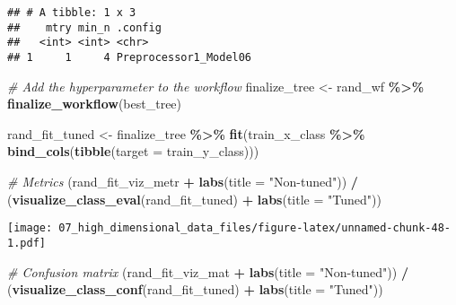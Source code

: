 \documentclass[
]{book}
\newenvironment{Shaded}{\begin{snugshade}}{\end{snugshade}}
\newcommand{\CommentTok}[1]{\textcolor[rgb]{0.56,0.35,0.01}{\textit{#1}}}
\newcommand{\DataTypeTok}[1]{\textcolor[rgb]{0.13,0.29,0.53}{#1}}
\newcommand{\KeywordTok}[1]{\textcolor[rgb]{0.13,0.29,0.53}{\textbf{#1}}}
\newcommand{\NormalTok}[1]{#1}
\newcommand{\OperatorTok}[1]{\textcolor[rgb]{0.81,0.36,0.00}{\textbf{#1}}}
\newcommand{\StringTok}[1]{\textcolor[rgb]{0.31,0.60,0.02}{#1}}
\begin{document}
\begin{verbatim}
## # A tibble: 1 x 3
##    mtry min_n .config              
##   <int> <int> <chr>                
## 1     1     4 Preprocessor1_Model06
\end{verbatim}

\begin{Shaded}
\begin{Highlighting}[]
\CommentTok{\# Add the hyperparameter to the workflow}
\NormalTok{finalize\_tree \textless{}{-}}\StringTok{ }\NormalTok{rand\_wf }\OperatorTok{\%\textgreater{}\%}
\StringTok{  }\KeywordTok{finalize\_workflow}\NormalTok{(best\_tree)}
\end{Highlighting}
\end{Shaded}

\begin{Shaded}
\begin{Highlighting}[]
\NormalTok{rand\_fit\_tuned \textless{}{-}}\StringTok{ }\NormalTok{finalize\_tree }\OperatorTok{\%\textgreater{}\%}
\StringTok{  }\KeywordTok{fit}\NormalTok{(train\_x\_class }\OperatorTok{\%\textgreater{}\%}\StringTok{ }\KeywordTok{bind\_cols}\NormalTok{(}\KeywordTok{tibble}\NormalTok{(}\DataTypeTok{target =}\NormalTok{ train\_y\_class)))}

\CommentTok{\# Metrics}
\NormalTok{(rand\_fit\_viz\_metr }\OperatorTok{+}\StringTok{ }\KeywordTok{labs}\NormalTok{(}\DataTypeTok{title =} \StringTok{"Non{-}tuned"}\NormalTok{)) }\OperatorTok{/}\StringTok{ }\NormalTok{(}\KeywordTok{visualize\_class\_eval}\NormalTok{(rand\_fit\_tuned) }\OperatorTok{+}\StringTok{ }\KeywordTok{labs}\NormalTok{(}\DataTypeTok{title =} \StringTok{"Tuned"}\NormalTok{))}
\end{Highlighting}
\end{Shaded}

\texttt{[image: 07\_high\_dimensional\_data\_files/figure-latex/unnamed-chunk-48-1.pdf]}

\begin{Shaded}
\begin{Highlighting}[]
\CommentTok{\# Confusion matrix}
\NormalTok{(rand\_fit\_viz\_mat }\OperatorTok{+}\StringTok{ }\KeywordTok{labs}\NormalTok{(}\DataTypeTok{title =} \StringTok{"Non{-}tuned"}\NormalTok{)) }\OperatorTok{/}\StringTok{ }\NormalTok{(}\KeywordTok{visualize\_class\_conf}\NormalTok{(rand\_fit\_tuned) }\OperatorTok{+}\StringTok{ }\KeywordTok{labs}\NormalTok{(}\DataTypeTok{title =} \StringTok{"Tuned"}\NormalTok{))}
\end{Highlighting}
\end{Shaded}
\end{document}
